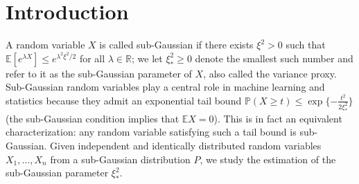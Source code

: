 \documentclass{article}
\theoremstyle{definition}
\newcommand*\eps{\epsilon}
\renewcommand*\epsilon{\varepsilon}
\newcommand{\1}{\mathbbm{1}}
\begin{document}
\begin{abstract}
\end{abstract}



\section{Introduction}

A random variable $X$ is called sub-Gaussian if there exists $\xi^2 > 0$ such that $\mathbb{E}[e^{\lambda X}] \leq e^{\lambda^2 \xi^2 / 2}$ for all $\lambda \in \mathbb{R}$; we let $\xi^2_* \geq 0$ denote the smallest such number and refer to it as the sub-Gaussian parameter of $X$, also called the variance proxy. Sub-Gaussian random variables play a central role in machine learning and statistics because they admit an exponential tail bound $\mathbb{P}(X \geq t) \leq \exp\{ - \frac{t^2}{2 \xi_*^2}\}$ (the sub-Gaussian condition implies that $\mathbb{E}X = 0$). This is in fact an equivalent characterization: any random variable satisfying such a tail bound is sub-Gaussian. Given independent and identically distributed random variables $X_1, \ldots, X_n$ from a sub-Gaussian distribution $P$, we study the estimation of the sub-Gaussian parameter $\xi^2_*$. 
\end{document}
